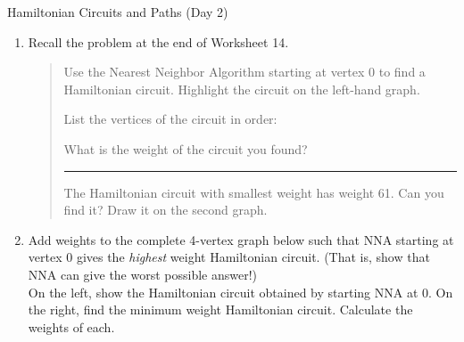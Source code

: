 \documentclass[12pt]{article}
\newcommand{\ans}[1][1in]{\rule{#1}{.5pt}}
\begin{document}
\begin{center}
{\Large Hamiltonian Circuits and Paths (Day 2)}
\end{center}
\begin{enumerate}


\item Recall the problem at the end of Worksheet 14. 

\begin{quote}
Use the Nearest Neighbor Algorithm starting at vertex 0 to find a Hamiltonian circuit. Highlight the circuit on the left-hand graph.

\hfill
{}
\bigskip

List the vertices of the circuit in order: \hrulefill

What is the weight of the circuit you found? \ans

The Hamiltonian circuit with smallest weight has weight 61. Can you find it? Draw it on the second graph.
\end{quote}

\item Add weights to the complete 4-vertex graph below such that NNA starting at vertex $0$ gives the \emph{highest} weight Hamiltonian circuit. (That is, show that NNA can give the worst possible answer!)\\
On the left, show the Hamiltonian circuit obtained by starting NNA at 0. On the right, find the minimum weight Hamiltonian circuit. Calculate the weights of each.


\end{enumerate}
\end{document}

